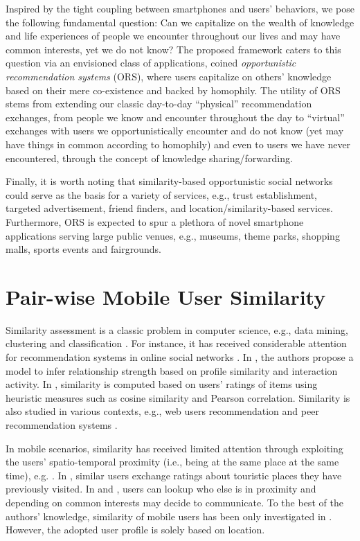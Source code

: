 \documentclass[conference]{IEEEtran}
\theoremstyle{definition}
\begin{document}
Inspired by the tight coupling between smartphones and users' behaviors, we pose the following fundamental question: Can we capitalize on the wealth of knowledge and life experiences of people we encounter throughout our lives and may have common interests, yet we do not know? The proposed framework caters to this question via an envisioned class of applications, coined {\it opportunistic recommendation systems} (ORS), where users capitalize on others' knowledge based on their mere co-existence and backed by homophily. The utility of ORS stems from extending our classic day-to-day ``physical'' recommendation exchanges, from people we know and encounter throughout the day to ``virtual'' exchanges with users we opportunistically encounter and do not know (yet may have things in common according to homophily) and even to users we have never encountered, through the concept of knowledge sharing/forwarding.

Finally, it is worth noting that similarity-based opportunistic social networks could serve as the basis for a variety of services, e.g., trust establishment, targeted advertisement, friend finders, and location/similarity-based services. Furthermore, ORS is expected to spur a plethora of novel smartphone applications serving large public venues, e.g., museums, theme parks, shopping malls, sports events and fairgrounds.
\vspace{-0.6 cm}
\section{Pair-wise Mobile User Similarity}
\vspace{-0.4 cm}
Similarity assessment is
a classic problem in computer science, e.g., data mining, 
clustering and classification \cite{dm1,dm2}. For instance, it has received
considerable attention for recommendation systems in online social networks \cite{soc1,soc2,cf,p2p}. In \cite{soc1}, the authors propose a model to 
infer relationship strength based on profile similarity and interaction 
activity. In \cite{soc2}, similarity is computed based on 
users' ratings of items using heuristic measures such as cosine 
similarity and Pearson correlation. Similarity is also studied in various 
contexts, e.g., web users recommendation \cite{cf} and peer
recommendation systems \cite{p2p}.

In mobile scenarios, similarity has received limited attention through
exploiting the users' spatio-temporal proximity (i.e., being at the same
place at the same time), e.g. \cite{lbd,ms,stp}. In \cite{stp}, similar 
users exchange ratings about touristic places they have previously visited. 
In \cite{lbd} and \cite{ms},
users can lookup who else is in proximity and depending on common interests
may decide to communicate. To the best of the authors' knowledge, 
similarity of mobile users has been only investigated in \cite{lbd,ms,loc1,loc2}.
However, the adopted user profile is solely based on location. 
%
\vspace{-0.3 cm}
\end{document}
